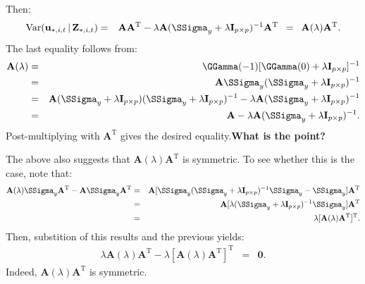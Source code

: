 \documentclass[a4paper]{article}
\theoremstyle{myexamplestyle}
\def\reminder#1{\marginpar{\rule[0pt]{1mm}{11pt}}\textbf{#1}}
\begin{document}
Then:
\begin{eqnarray*}
\mbox{Var}(\mathbf{u}_{\ast, i, t} \, | \, \mathbf{Z}_{\ast, i, t})
& = & \mathbf{A} \mathbf{A}^{\mathrm{T}} - \lambda \mathbf{A} (\SSigma_y + \lambda \mathbf{I}_{p \times p})^{-1} \mathbf{A}^{\mathrm{T}} \, \, \, = \, \, \, \mathbf{A}(\lambda) \mathbf{A}^{\mathrm{T}}.
\end{eqnarray*}
The last equality follows from:
\begin{eqnarray*}
\mathbf{A}(\lambda) & = & \GGamma(-1) [\GGamma(0) + \lambda \mathbf{I}_{p \times p}]^{-1}
\\
& = & \mathbf{A} \SSigma_y (\SSigma_y + \lambda \mathbf{I}_{p \times p})^{-1}
\\
& = & \mathbf{A} (\SSigma_y + \lambda \mathbf{I}_{p \times p})  (\SSigma_y + \lambda \mathbf{I}_{p \times p})^{-1} -
\lambda \mathbf{A}  (\SSigma_y + \lambda \mathbf{I}_{p \times p})^{-1}
\\
& = & \mathbf{A} - \lambda \mathbf{A} (\SSigma_y + \lambda \mathbf{I}_{p \times p})^{-1}.
\end{eqnarray*}
Post-multiplying with $\mathbf{A}^{\mathrm{T}}$ gives the desired equality.\reminder{What is the point?}

The above also suggests that $\mathbf{A}(\lambda) \mathbf{A}^{\mathrm{T}}$ is symmetric. To see whether this is the case, note that:
\begin{eqnarray*}
\mathbf{A}(\lambda) \SSigma_y \mathbf{A}^{\mathrm{T}} - \mathbf{A} \SSigma_y \mathbf{A}^{\mathrm{T}} & = & \mathbf{A} [ \SSigma_y (\SSigma_y + \lambda \mathbf{I}_{p \times p})^{-1} \SSigma_y -  \SSigma_y] \mathbf{A}^{\mathrm{T}}
\\
& = & \mathbf{A} [\lambda (\SSigma_y + \lambda \mathbf{I}_{p \times p})^{-1} \SSigma_y ] \mathbf{A}^{\mathrm{T}}
\\
& = & \lambda [ \mathbf{A}(\lambda) \mathbf{A}^{\mathrm{T}} ]^{\mathrm{T}}.
\end{eqnarray*}
Then, substition of this results and the previous yields:
\begin{eqnarray*}
\lambda  \mathbf{A}(\lambda) \mathbf{A}^{\mathrm{T}} -
\lambda [ \mathbf{A}(\lambda) \mathbf{A}^{\mathrm{T}} ]^{\mathrm{T}} & = &
\mathbf{0}.
\end{eqnarray*}
Indeed, $\mathbf{A}(\lambda) \mathbf{A}^{\mathrm{T}}$ is symmetric.


\end{document}
